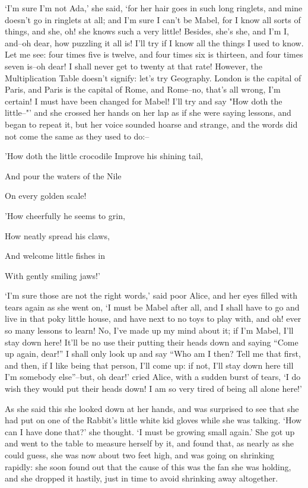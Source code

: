 \documentclass[statementpaper,twoside,openany]{memoir}
\begin{document}
`I'm sure I'm not Ada,' she said, `for her hair goes in such long ringlets, and mine doesn't go in ringlets at all; and I'm sure I can't be Mabel, for I know all sorts of things, and she, oh! she knows such a very little! Besides, she's she, and I'm I, and--oh dear, how puzzling it all is! I'll try if I know all the things I used to know. Let me see: four times five is twelve, and four times six is thirteen, and four times seven is--oh dear! I shall never get to twenty at that rate! However, the Multiplication Table doesn't signify: let's try Geography. London is the capital of Paris, and Paris is the capital of Rome, and Rome--no, that's all wrong, I'm certain! I must have been changed for Mabel! I'll try and say "How doth the little--"' and she crossed her hands on her lap as if she were saying lessons, and began to repeat it, but her voice sounded hoarse and strange, and the words did not come the same as they used to do:--

'How doth the little crocodile
Improve his shining tail,

And pour the waters of the Nile

On every golden scale!


'How cheerfully he seems to grin,

How neatly spread his claws,

And welcome little fishes in

With gently smiling jaws!'

`I'm sure those are not the right words,' said poor Alice, and her eyes filled with tears again as she went on, `I must be Mabel after all, and I shall have to go and live in that poky little house, and have next to no toys to play with, and oh! ever so many lessons to learn! No, I've made up my mind about it; if I'm Mabel, I'll stay down here! It'll be no use their putting their heads down and saying ``Come up again, dear!'' I shall only look up and say ``Who am I then? Tell me that first, and then, if I like being that person, I'll come up: if not, I'll stay down here till I'm somebody else''--but, oh dear!' cried Alice, with a sudden burst of tears, `I do wish they would put their heads down! I am so very tired of being all alone here!'

As she said this she looked down at her hands, and was surprised to see that she had put on one of the Rabbit's little white kid gloves while she was talking. `How can I have done that?' she thought. `I must be growing small again.' She got up and went to the table to measure herself by it, and found that, as nearly as she could guess, she was now about two feet high, and was going on shrinking rapidly: she soon found out that the cause of this was the fan she was holding, and she dropped it hastily, just in time to avoid shrinking away altogether.
\end{document}
